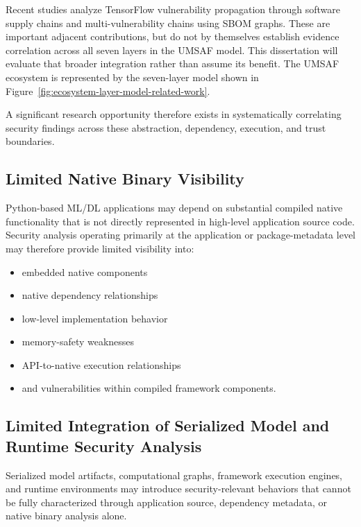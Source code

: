 \documentclass[
  12pt,
  letterpaper,
  oneside]{report}
\providecommand{\tightlist}{%
  \setlength{\itemsep}{0pt}\setlength{\parskip}{0pt}}
\begin{document}
Recent studies analyze TensorFlow vulnerability propagation through
software supply chains and multi-vulnerability chains using SBOM graphs.
These are important adjacent contributions, but do not by themselves
establish evidence correlation across all seven layers in the UMSAF
model.\cite{zhou2025unraveling,baird2026attackchains,tan2026securing}
This dissertation will evaluate that broader integration rather than
assume its benefit. The UMSAF ecosystem is represented by the seven-layer
model shown in Figure~\ref{fig:ecosystem-layer-model-related-work}.

A significant research opportunity therefore exists in systematically
correlating security findings across these abstraction, dependency,
execution, and trust boundaries.

\subsection{Limited Native Binary Visibility}\label{3-limited-native-binary-visibility}

Python-based ML/DL applications may depend on substantial compiled
native functionality that is not directly represented in high-level
application source code. Security analysis operating primarily at the
application or package-metadata level may therefore provide limited
visibility into:

\begin{itemize}
\tightlist
\item
  embedded native components
\item
  native dependency relationships
\item
  low-level implementation behavior
\item
  memory-safety weaknesses
\item
  API-to-native execution relationships
\item
  and vulnerabilities within compiled framework components.
\end{itemize}

\subsection{Limited Integration of Serialized Model and Runtime Security Analysis}\label{4-limited-integration-of-serialized-model-and-runtime-security-analysis}

Serialized model artifacts, computational graphs, framework execution
engines, and runtime environments may introduce security-relevant
behaviors that cannot be fully characterized through application source,
dependency metadata, or native binary analysis alone.
\end{document}
